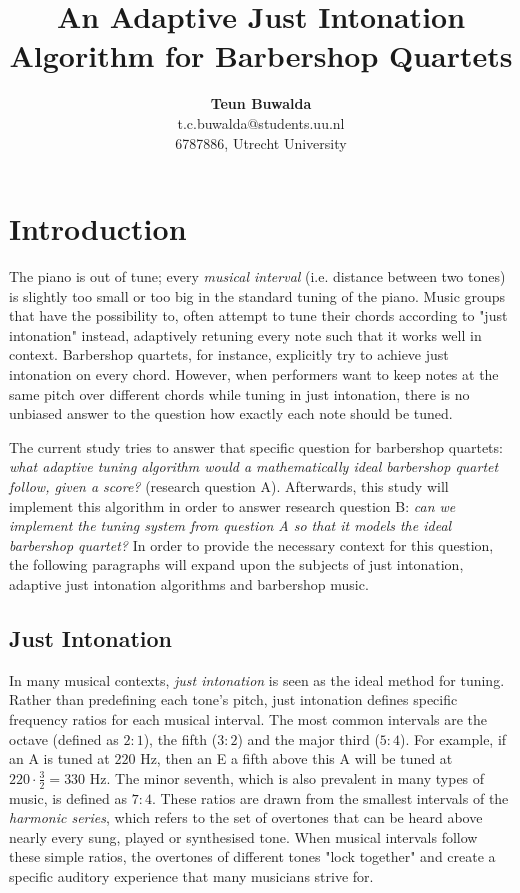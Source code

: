 \documentclass[a4paper]{article}
\title{An Adaptive Just Intonation Algorithm for Barbershop Quartets}
\author{{\bf Teun Buwalda}\\t.c.buwalda@students.uu.nl\\6787886, Utrecht University}
\begin{document}
\maketitle

\section{Introduction}
The piano is out of tune; every \textit{musical interval} (i.e. distance between two tones) is slightly too small or too big in the standard tuning of the piano.\cite{van_de_craats_fis_1989} Music groups that have the possibility to, often attempt to tune their chords according to "just intonation" instead, adaptively retuning every note such that it works well in context. Barbershop quartets, for instance, explicitly try to achieve just intonation on every chord. However, when performers want to keep notes at the same pitch over different chords while tuning in just intonation, there is no unbiased answer to the question how exactly each note should be tuned.

The current study tries to answer that specific question for barbershop quartets: {\it what adaptive tuning algorithm would a mathematically ideal barbershop quartet follow, given a score?} (research question A). Afterwards, this study will implement this algorithm in order to answer research question B: {\it can we implement the tuning system from question A so that it models the ideal barbershop quartet?} In order to provide the necessary context for this question, the following paragraphs will expand upon the subjects of just intonation, adaptive just intonation algorithms and barbershop music.

\subsection{Just Intonation}
\label{intro_ji}

In many musical contexts, {\it just intonation} is seen as the ideal method for tuning. Rather than predefining each tone's pitch, just intonation defines specific frequency ratios for each musical interval. The most common intervals are the octave (defined as $2:1$), the fifth ($3:2$) and the major third ($5:4$). For example, if an A is tuned at $220$ Hz, then an E a fifth above this A will be tuned at $220 \cdot \frac32 = 330$ Hz. The minor seventh, which is also prevalent in many types of music, is defined as $7:4$. These ratios are drawn from the smallest intervals of the \textit{harmonic series}, which refers to the set of overtones that can be heard above nearly every sung, played or synthesised tone. When musical intervals follow these simple ratios, the overtones of different tones "lock together" and create a specific auditory experience that many musicians strive for.
\end{document}
